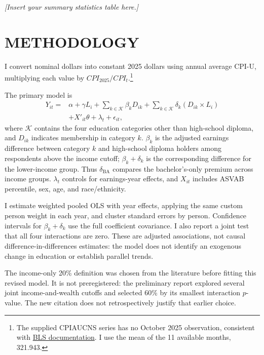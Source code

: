 \documentclass[12pt,letterpaper]{article}
\begin{document}
\textit{[Insert your summary statistics table here.]}

\section*{METHODOLOGY}
I convert nominal dollars into constant 2025 dollars using annual average CPI-U,
multiplying each value by $CPI_{2025}/CPI_t$.\footnote{The supplied CPIAUCNS series
has no October 2025 observation, consistent with
\href{https://www.bls.gov/news.release/archives/cpi_12182025.htm}{BLS documentation}.
I use the mean of the 11 available months, 321.943.}

The primary model is
\[
\begin{aligned}
    Y_{it}={}&\alpha+\gamma L_i+\sum_{k\in\mathcal K}\beta_k D_{ik}
              +\sum_{k\in\mathcal K}\delta_k(D_{ik}\times L_i)\\
             &+X'_{it}\theta+\lambda_t+\epsilon_{it},
\end{aligned}
\]
where $\mathcal K$ contains the four education categories other than high-school
diploma, and $D_{ik}$ indicates membership in category $k$. $\beta_k$ is the adjusted
earnings difference between category $k$ and high-school diploma holders among
respondents above the income cutoff; $\beta_k+\delta_k$ is the corresponding
difference for the lower-income group. Thus $\delta_{\mathrm{BA}}$ compares the
bachelor's-only premium across income groups. $\lambda_t$ controls for earnings-year
effects, and $X_{it}$ includes ASVAB percentile, sex, age, and race/ethnicity.\newline

I estimate weighted pooled OLS with year effects, applying the same custom person
weight in each year, and cluster standard errors by person. Confidence intervals
for $\beta_k+\delta_k$ use the full coefficient covariance. I also report a joint
test that all four interactions are zero. These are adjusted associations, not
causal difference-in-differences estimates: the model does not identify an
exogenous change in education or establish parallel trends.\newline

The income-only 20\% definition was chosen from the literature before fitting this
revised model. It is not preregistered: the preliminary report explored several
joint income-and-wealth cutoffs and selected 60\% by its smallest interaction
$p$-value. The new citation does not retrospectively justify that earlier choice.\newline
\end{document}
